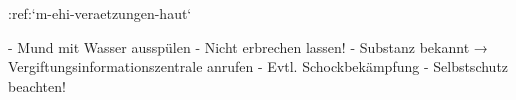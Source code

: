:ref:`m-ehi-veraetzungen-haut`
\begin{itemize}
    -   Mund mit Wasser ausspülen
    -   Nicht erbrechen lassen!
    -   Substanz bekannt → Vergiftungsinformationszentrale anrufen
    -   Evtl. Schockbekämpfung
    -   Selbstschutz beachten!
\end{itemize}